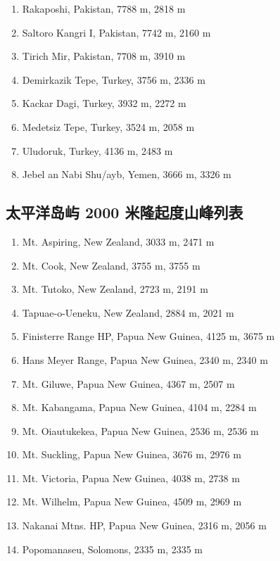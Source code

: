 \documentclass[10pt,twocolumn,letterpaper]{article}
\begin{document}
\begin{flushleft}
\begin{enumerate}
    \item Rakaposhi, Pakistan, 7788 m, 2818 m
    \item Saltoro Kangri I, Pakistan, 7742 m, 2160 m
    \item Tirich Mir, Pakistan, 7708 m, 3910 m
    \item Demirkazik Tepe, Turkey, 3756 m, 2336 m
    \item Kackar Dagi, Turkey, 3932 m, 2272 m
    \item Medetsiz Tepe, Turkey, 3524 m, 2058 m
    \item Uludoruk, Turkey, 4136 m, 2483 m
    \item Jebel an Nabi Shu/ayb, Yemen, 3666 m, 3326 m
\end{enumerate}
\end{flushleft}

\subsection{太平洋岛屿 2000 米隆起度山峰列表}

\begin{flushleft}
\begin{enumerate}
    \item Mt. Aspiring, New Zealand, 3033 m, 2471 m
    \item Mt. Cook, New Zealand, 3755 m, 3755 m
    \item Mt. Tutoko, New Zealand, 2723 m, 2191 m
    \item Tapuae-o-Ueneku, New Zealand, 2884 m, 2021 m
    \item Finisterre Range HP, Papua New Guinea, 4125 m, 3675 m
    \item Hans Meyer Range, Papua New Guinea, 2340 m, 2340 m
    \item Mt. Giluwe, Papua New Guinea, 4367 m, 2507 m
    \item Mt. Kabangama, Papua New Guinea, 4104 m, 2284 m
    \item Mt. Oiautukekea, Papua New Guinea, 2536 m, 2536 m
    \item Mt. Suckling, Papua New Guinea, 3676 m, 2976 m
    \item Mt. Victoria, Papua New Guinea, 4038 m, 2738 m
    \item Mt. Wilhelm, Papua New Guinea, 4509 m, 2969 m
    \item Nakanai Mtns. HP, Papua New Guinea, 2316 m, 2056 m
    \item Popomanaseu, Solomons, 2335 m, 2335 m
\end{enumerate}
\end{flushleft}
\end{document}
